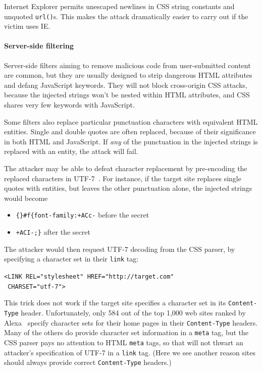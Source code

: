 \documentclass{acm_proc_article-sp}
\begin{document}
Internet Explorer permits unescaped newlines in CSS string constants
and unquoted \texttt{url()}s.  This makes the attack dramatically
easier to carry out if the victim uses IE.

\paragraph{Server-side filtering}
Server-side filters aiming to remove malicious code from
user-submitted content are common, but they are usually designed to
strip dangerous HTML attributes and defang JavaScript keywords.  They
will not block cross-origin CSS attacks, because the injected strings
won't be nested within HTML attributes, and CSS shares very few
keywords with JavaScript.

Some filters also replace particular punctuation characters with
equivalent HTML entities.  Single and double quotes are often
replaced, because of their significance in both HTML and JavaScript.
If \emph{any} of the punctuation in the injected strings is replaced
with an entity, the attack will fail.

The attacker may be able to defeat character replacement by
pre-encoding the replaced characters in UTF-7~\cite{utf7}.  For
instance, if the target site replaces single quotes with entities, but
leaves the other punctuation alone, the injected strings would become
\begin{itemize}
\item \verb|{}#f{font-family:+ACc-| before the secret
\item \verb|+ACI-;}| after the secret
\end{itemize}
The attacker would then request UTF-7 decoding from the CSS parser,
by specifying a character set in their \verb|link| tag:

\verb|<LINK REL="stylesheet" HREF="http://target.com"|\\
\verb| CHARSET="utf-7">|

This trick does not work if the target site specifies a character set
in its \texttt{Content-Type} header.  Unfortunately, only 584 out of
the top 1,000 web sites ranked by Alexa~\cite{alexa} specify character
sets for their home pages in their \texttt{Content-Type} headers.
Many of the others do provide character set information in a
\verb|meta| tag, but the CSS parser pays no attention to HTML
\verb|meta| tags, so that will not thwart an attacker's specification
of UTF-7 in a \verb|link| tag.  (Here we see another reason sites
should always provide correct \texttt{Content-Type} headers.)
\end{document}
